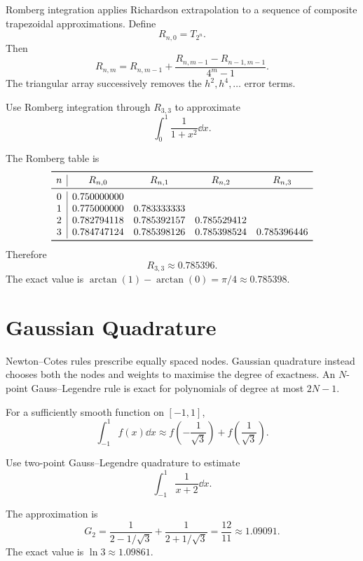 Romberg integration applies Richardson extrapolation to a sequence of composite trapezoidal approximations.  Define
\[
 R_{n,0}=T_{2^n}.
\]
Then
\[
 R_{n,m}=R_{n,m-1}
 +\frac{R_{n,m-1}-R_{n-1,m-1}}{4^m-1}.
\]
The triangular array successively removes the $h^2,h^4,\ldots$ error terms.

\begin{example}
Use Romberg integration through $R_{3,3}$ to approximate
\[
 \int_0^1\frac{1}{1+x^2}\dd x.
\]
\end{example}

\begin{solution}[7.0cm]
The Romberg table is
\[
\begin{array}{c|cccc}
\toprule
n&R_{n,0}&R_{n,1}&R_{n,2}&R_{n,3}\\
\midrule
0&0.750000000&&&\\
1&0.775000000&0.783333333&&\\
2&0.782794118&0.785392157&0.785529412&\\
3&0.784747124&0.785398126&0.785398524&0.785396446\\
\bottomrule
\end{array}
\]
Therefore
\[
 R_{3,3}\approx0.785396.
\]
The exact value is $\arctan(1)-\arctan(0)=\pi/4\approx0.785398$.
\end{solution}

\section{Gaussian Quadrature}

Newton--Cotes rules prescribe equally spaced nodes.  Gaussian quadrature instead chooses both the nodes and weights to maximise the degree of exactness.  An $N$-point Gauss--Legendre rule is exact for polynomials of degree at most $2N-1$.

\begin{theorem}
For a sufficiently smooth function on $[-1,1]$,
\[
 \int_{-1}^{1}f(x)\dd x
 \approx
 f\left(-\frac1{\sqrt3}\right)
 +f\left(\frac1{\sqrt3}\right).
\]
\end{theorem}

\begin{example}
Use two-point Gauss--Legendre quadrature to estimate
\[
 \int_{-1}^{1}\frac1{x+2}\dd x.
\]
\end{example}

\begin{solution}[3.5cm]
The approximation is
\[
 G_2
 =\frac1{2-1/\sqrt3}
 +\frac1{2+1/\sqrt3}
 =\frac{12}{11}
 \approx1.09091.
\]
The exact value is $\ln3\approx1.09861$.
\end{solution}

